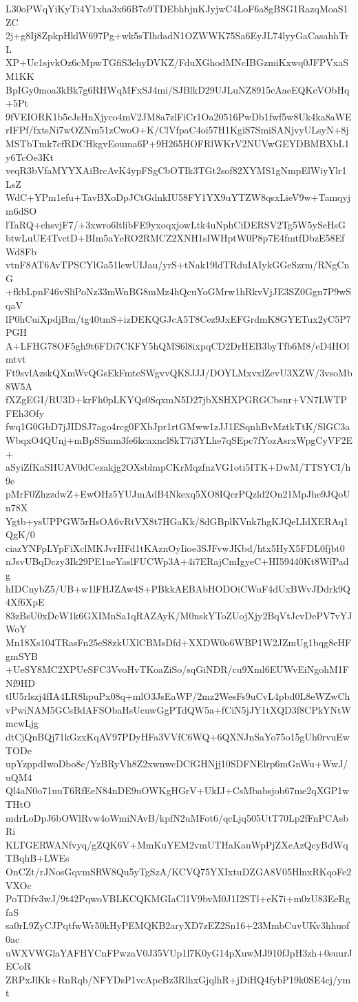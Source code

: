 L30oPWqYiKyTi4Y1xha3x66B7o9TDEbhbjnKJyjwC4LoF6a8gBSG1RazqMoaS1ZC
2j+g8Ij8ZpkpHklW697Pg+wk5sTlhdadN1OZWWK75Sa6EyJL74lyyGaCasahhTrL
XP+Uc1sjvkOz6cMpwTGfiS3ehyDVKZ/FduXGhodMNcIBGzmiKxwq0JFPVxaSM1KK
BpIGy0moa3kBk7g6RHWqMFxSJ4mi/SJBlkD29UJLuNZ8915cAaeEQKcVObHq+5Pt
9fVEIORK1b5cJsHnXjyco4mV2JM8a7zlFiCr1Oa20516PwDb1fwf5w8Uk4ka8aWE
rIFPf/fxtsNi7wOZNm51zCwoO+K/ClVfpaC4oi57H1KgiS7SmiSANjvyULsyN+8j
MSTbTmk7cfRDCHkgvEouma6P+9H265HOFRlWKrV2NUVwGEYDBMBXbL1y6TcOe3Kt
veqR3bVfaMYYXAiBrcAvK4ypFSgCbOTIk3TGt2sof82XYMS1gNmpElWiyYlr1LsZ
WdC+YPm1efu+TavBXoDpJCtGdnkIU58FY1YX9uYTZW8qsxLieV9w+Tamqyjm6dSO
lTaRQ+chsvjF7/+3xwro6ltlibFE9yxoqxjowLtk4uNphCiDERSV2Tg5W5ySeHsG
btwLuUE4TvctD+BIm5aYeRO2RMCZ2XNH1sIWHptW0P8p7E4fmtfDbzE58EfWd8Fb
vtnF8AT6AvTPSCYlGa51lcwUIJau/yrS+tNak19ldTRduIAIykGGeSzrm/RNgCnG
+fkbLpnF46vSliPoNz33mWnBG8mMz4hQcuYoGMrw1hRkvVjJE3SZ0Ggn7P9wSqaV
lP0hCuiXpdjBm/tg40tmS+izDEKQGJcA5T8Cez9JxEFGrdmK8GYETux2yC5P7PGH
A+LFHG78OF5gh9t6FDi7CKFY5hQMS6l8ixpqCD2DrHEB3byTfb6M8/eD4HOlmtvt
Ft9svlAzskQXmWvQGsEkFmtcSWgvvQKSJJJ/DOYLMxvxlZevU3XZW/3vsoMb8W5A
fXZgEGI/RU3D+krFh0pLKYQs0SqxmN5D27jbXSHXPGRGCbsnr+VN7LWTPFEh3Ofy
fwq1G0GbD7jJIDSJ7ago4rcg0FXbJpr1rtGMww1zJJ1ESqnhBvMztkTtK/SlGC3a
WbqxO4QUnj+mBpSSmm3fe6kcaxncl8kT7i3YLhe7qSEpc7fYozAsrxWpgCyVF2E+
aSyiZfKaSHUAV0dCezakjg2OXsblmpCKrMqzfnzVG1oti5ITK+DwM/TTSYCI/h9e
pMrF0ZhzzdwZ+EwOHz5YUJmAdB4Nkexq5XO8IQcrPQzld2On21MpJhe9JQoUn78X
Ygtb+ysUPPGW5rHsOA6vRtVX8t7HGaKk/8dGBplKVnk7hgKJQeLIdXERAq1QgK/0
ciazYNFpLYpFiXclMKJvrHFd1tKAznOyIioe3SJFvwJKbd/htx5HyX5FDL0fjbt0
nJsvUBqDczy3Ik29PE1neYaslFUCWp3A+4i7ERajCmIgyeC+HI59440Kt8WfPadg
hIDCnybZ5/UB+w1lFHJZAw4S+PBkkAEBAbHODOiCWuF4dUxBWvJDdrk9Q4Xf6XpE
83zBsU0xDcW1k6GXIMnSa1qRAZAyK/M0nskYToZUojXjy2BqVtJcvDePV7vYJWoY
Mn18Xs104TRasFn25eS8zkUXlCBMsDfd+XXDW0o6WBP1W2JZmUg1bqg8eHFgmSYB
+UeSY8MC2XPUeSFC3VvoHvTKoaZiSo/sqGiNDR/cu9Xml6EUWvEiNgohM1FNf9HD
tlU5rlszj4fIA4LR8hpuPx08q+mlO3JsEaWP/2mz2WesFs9uCvL4pbd0L8eWZwCh
vPwiNAM5GCsBdAFSObaHsUcuwGgPTdQW5a+fCiN5jJY1tXQD3f8CPkYNtWmcwLjg
dtCjQnBQj71kGzxKqAV97PDyHFa3VVfC6WQ+6QXNJnSaYo75o15gUh0rvuEwTODe
upYzppdIwoDbo8c/YzBRyVh8Z2xwnwcDCfGHNjj10SDFNElrp6mGnWu+WwJ/uQM4
Ql4aN0o71uuT6RfEeN84nDE9uOWKgHGrV+UkIJ+CsMbabsjob67me2qXGP1wTHtO
mdrLoDpJ6bOWlRvw4oWmiNAvB/kpfN2uMFot6/qcLjq505UtT70Lp2fFnPCAsbRi
KLTGERWANfvyq/gZQK6V+MmKuYEM2vmUTHaKauWpPjZXeAzQcyBdWqTBqhB+LWEs
OnCZt/rJNosGqvmSRW8Qu5yTgSzA/KCVQ75YXIxtuDZGA8V05HlnxRKqoFe2VXOc
PoTDfv3wJ/9t42PqwoVBLKCQKMGIaCl1V9bvM0J1I2STl+eK7i+m0zU83EeRgfaS
sa0rL9ZyCJPqtfwWr50kHyPEMQKB2aryXD7zEZ2Sn16+23MmbCuvUKv3hhuof0ac
uWXVWGlaYAFHYCnFPwzaV0J35VUp1l7K0yG14pXuwMJ910fJpH3zh+0suurJECoR
ZRPxJlKk+RnRqb/NFYDsP1vcApcBz3RlhxGjqlhR+jDiHQ4fybP19k0SE4cj/ymt
